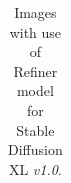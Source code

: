 \begin{table}[H]
\begin{tabularx}{\linewidth}{@{}>{\centering\arraybackslash}m{3cm}>{\centering\arraybackslash}X>{\centering\arraybackslash}X>{\centering\arraybackslash}X>{\centering\arraybackslash}X@{}}
\midrule
\bottomrule
\end{tabularx}
\caption{Images with use of Refiner model for Stable Diffusion XL \textit{v1.0}.}
\label{tab:image_comparison_dreambooth_xl_refiner}
\end{table}

